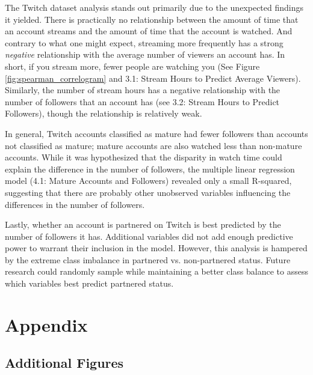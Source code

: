 \documentclass[12pt]{article}
\begin{document}
The Twitch dataset analysis stands out primarily due to the unexpected findings it yielded. There is practically no relationship between the amount of time that an account streams and the amount of time that the account is watched. And contrary to what one might expect, streaming more frequently has a strong \emph{negative} relationship with the average number of viewers an account has. In short, if you stream more, fewer people are watching you (See Figure \ref{fig:spearman_correlogram} and 3.1: Stream Hours to Predict Average Viewers). Similarly, the number of stream hours has a negative relationship with the number of followers that an account has (see 3.2: Stream Hours to Predict Followers), though the relationship is relatively weak.

In general, Twitch accounts classified as mature had fewer followers than accounts not classified as mature; mature accounts are also watched less than non-mature accounts. While it was hypothesized that the disparity in watch time could explain the difference in the number of followers, the multiple linear regression model (4.1: Mature Accounts and Followers) revealed only a small R-squared, suggesting that there are probably other unobserved variables influencing the differences in the number of followers. 

Lastly, whether an account is partnered on Twitch is best predicted by the number of followers it has. Additional variables did not add enough predictive power to warrant their inclusion in the model. However, this analysis is hampered by the extreme class imbalance in partnered vs. non-partnered status. Future research could randomly sample while maintaining a better class balance to assess which variables best predict partnered status.  












\newpage 

\section{Appendix}

\subsection{Additional Figures}
\end{document}
